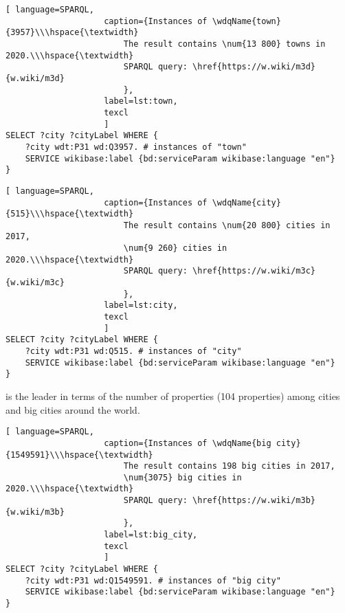 \begin{lstlisting}[ language=SPARQL, 
                    caption={Instances of \wdqName{town}{3957}\\\hspace{\textwidth}
                        The result contains \num{13 800} towns in 2020.\\\hspace{\textwidth}
                        SPARQL query: \href{https://w.wiki/m3d}{w.wiki/m3d}
                        },
                    label=lst:town,
                    texcl 
                    ]
SELECT ?city ?cityLabel WHERE {
	?city wdt:P31 wd:Q3957. # instances of "town"
	SERVICE wikibase:label {bd:serviceParam wikibase:language "en"}
}
\end{lstlisting}%

\newpage

\begin{lstlisting}[ language=SPARQL, 
                    caption={Instances of \wdqName{city}{515}\\\hspace{\textwidth}
                        The result contains \num{20 800} cities in 2017, 
                        \num{9 260} cities in 2020.\\\hspace{\textwidth}
                        SPARQL query: \href{https://w.wiki/m3c}{w.wiki/m3c}
                        },
                    label=lst:city,
                    texcl 
                    ]
SELECT ?city ?cityLabel WHERE {
	?city wdt:P31 wd:Q515. # instances of "city"
	SERVICE wikibase:label {bd:serviceParam wikibase:language "en"}
}
\end{lstlisting}%

 is the leader in terms of the number of properties (104 properties) among cities and big cities around the world. %

\begin{lstlisting}[ language=SPARQL, 
                    caption={Instances of \wdqName{big city}{1549591}\\\hspace{\textwidth}
                        The result contains 198 big cities in 2017, 
                        \num{3075} big cities in 2020.\\\hspace{\textwidth}
                        SPARQL query: \href{https://w.wiki/m3b}{w.wiki/m3b}
                        },
                    label=lst:big_city,
                    texcl 
                    ]
SELECT ?city ?cityLabel WHERE {
	?city wdt:P31 wd:Q1549591. # instances of "big city"    
	SERVICE wikibase:label {bd:serviceParam wikibase:language "en"}
}
\end{lstlisting}%

